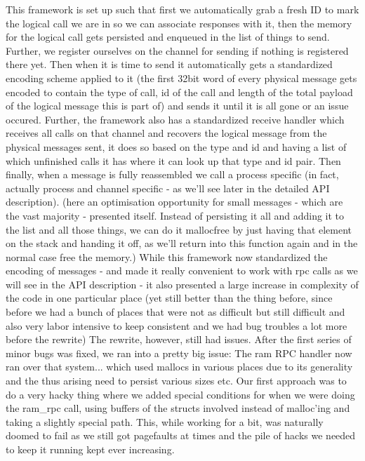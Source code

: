 This framework is set up such that first we automatically grab a fresh ID to mark the logical call we are in so we can associate responses with it, then the memory for the logical call gets persisted and enqueued in the list of things to send. Further, we register ourselves on the channel for sending if nothing is registered there yet.  
Then when it is time to send it automatically gets a standardized encoding scheme applied to it (the first 32bit word of every physical message gets encoded to contain the type of call, id of the call and length of the total payload of the logical message this is part of) and sends it until it is all gone or an issue occured.
Further, the framework also has a standardized receive handler which receives all calls on that channel and recovers the logical message from the physical messages sent, it does so based on the type and id and having a list of which unfinished calls it has where it can look up that type and id pair. Then finally, when a message is fully reassembled we call a process specific (in fact, actually process and channel specific - as we'll see later in the detailed API description). (here an optimisation opportunity for small messages - which are the vast majority - presented itself. Instead of persisting it all and adding it to the list and all those things, we can do it mallocfree by just having that element on the stack and handing it off, as we'll return into this function again and in the normal case free the memory.)
While this framework now standardized the encoding of messages - and made it really convenient to work with rpc calls as we will see in the API description - it also presented a large increase in complexity of the code in one particular place (yet still better than the thing before, since before we had a bunch of places that were not as difficult but still difficult and also very labor intensive to keep consistent and we had bug troubles a lot more before the rewrite)
The rewrite, however, still had issues. After the first series of minor bugs was fixed, we ran into a pretty big issue: The ram RPC handler now ran over that system... which used mallocs in various places due to its generality and the thus arising need to persist various sizes etc.
Our first approach was to do a very hacky thing where we added special conditions for when we were doing the ram\_rpc call, using buffers of the structs involved instead of malloc'ing and taking a slightly special path. This, while working for a bit, was naturally doomed to fail as we still got pagefaults at times and the pile of hacks we needed to keep it running kept ever increasing.
